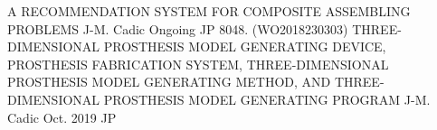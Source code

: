 \begin{cvhonors}
\cvpublication
    {A RECOMMENDATION SYSTEM FOR COMPOSITE ASSEMBLING PROBLEMS}
    {J-M. Cadic}
    {Ongoing}
    {JP}
\cvpublication
    {8048. (WO2018230303) THREE-DIMENSIONAL PROSTHESIS MODEL GENERATING DEVICE, PROSTHESIS FABRICATION SYSTEM, THREE-DIMENSIONAL PROSTHESIS MODEL GENERATING METHOD, AND THREE-DIMENSIONAL PROSTHESIS MODEL GENERATING PROGRAM}
    {J-M. Cadic}
    {Oct. 2019}
    {JP}
\end{cvhonors}
